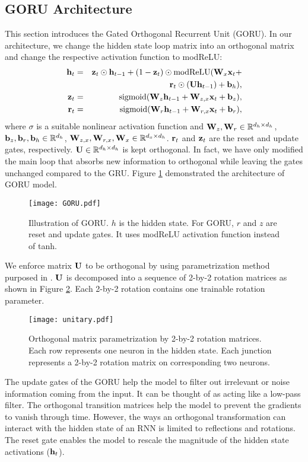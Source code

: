 \documentclass[letterpaper]{article} \usepackage{aaai18}  \usepackage{times}  \usepackage{helvet}  \usepackage{courier}  \usepackage{url}  \usepackage{graphicx}
\def\b{{\bf b}}
\def\r{{\bf r}}
\def\h{{\bf h}}
\def\x{{\bf x}}
\def\z{{\bf z}}
\def\U{{\bf U}}
\def\W{{\bf W}}
\begin{document}
\subsection{GORU Architecture}

This section introduces the Gated Orthogonal Recurrent Unit (GORU). In our architecture, we change the hidden state loop matrix into an orthogonal matrix and change the respective activation function to modReLU:
\begin{eqnarray}
\h_t &=& \z_t \odot \h_{t-1} + (1 - \z_t) \odot \mathrm{modReLU}(\W_x\x_t + \nonumber \\
&&\r_t \odot( \U\h_{t-1})+ \b_{h}),\\
\z_t &=& \mathrm{sigmoid}(\W_{z}\h_{t-1} + \W_{z,x}\x_{t} + \b_{z}),\\
\r_t &=& \mathrm{sigmoid}(\W_{r}\h_{t-1} + \W_{r,x}\x_{t} + \b_{r}),
\end{eqnarray}
where $\sigma$ is a suitable nonlinear activation function and 
$\W_z, \W_r \in \mathbb{R}^{d_h\times d_h}$, $\b_z, \b_r, \b_h \in \mathbb{R}^{d_h}$, $\W_{z, x}, \W_{r, x}, \W_x \in \mathbb{R}^{d_x\times d_h}$. 
$\r_t$ and $\z_t$ are the reset and update gates, respectively. $\U \in\mathbb{R}^{d_h\times d_h}$ is kept orthogonal. In fact, we have only modified the main loop that absorbs new information to orthogonal while leaving the gates unchanged compared to the GRU. Figure \ref{fig:goru} demonstrated the architecture of GORU model.
\begin{figure}[h!]
\centering
\texttt{[image: GORU.pdf]}
\caption{Illustration of GORU. $h$ is the hidden state. For GORU, $r$ and $z$ are reset and update gates. It uses modReLU activation function instead of tanh.}
\label{fig:goru}
\end{figure}  


We enforce matrix $\U$ to be orthogonal by using parametrization method purposed in \cite{jing2016tunable}. $\U$ is decomposed into a sequence of 2-by-2 rotation matrices as shown in Figure \ref{fig:unitary}. Each 2-by-2 rotation contains one trainable rotation parameter.
\begin{figure}[h!]
\centering
\texttt{[image: unitary.pdf]}
\caption{Orthogonal matrix parametrization by 2-by-2 rotation matrices. Each row represents one neuron in the hidden state. Each junction represents a 2-by-2 rotation matrix on corresponding two neurons.}
\label{fig:unitary}
\end{figure}  

The update gates of the GORU help the model to filter out irrelevant or noise information coming from the input. It can be thought of as acting like a low-pass filter. The orthogonal transition matrices help the model to prevent the gradients to vanish through time. However, the ways an orthogonal transformation can interact with the hidden state of an RNN is limited to reflections and rotations. The reset gate enables the model to rescale the magnitude of the hidden state activations ($\h_t$).
\end{document}
